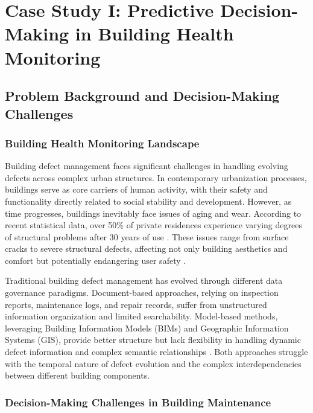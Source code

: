 
\chapter{Case Study I: Predictive Decision-Making in Building Health Monitoring} \label{chp:building}


\section{Problem Background and Decision-Making Challenges}

\subsection{Building Health Monitoring Landscape}

Building defect management faces significant challenges in handling evolving defects across complex urban structures. In contemporary urbanization processes, buildings serve as core carriers of human activity, with their safety and functionality directly related to social stability and development. However, as time progresses, buildings inevitably face issues of aging and wear. According to recent statistical data, over 50\% of private residences experience varying degrees of structural problems after 30 years of use \cite{spencer2019advances}. These issues range from surface cracks to severe structural defects, affecting not only building aesthetics and comfort but potentially endangering user safety \cite{zhang2023automated}.

Traditional building defect management has evolved through different data governance paradigms. Document-based approaches, relying on inspection reports, maintenance logs, and repair records, suffer from unstructured information organization and limited searchability. Model-based methods, leveraging Building Information Models (BIMs) and Geographic Information Systems (GIS), provide better structure but lack flexibility in handling dynamic defect information and complex semantic relationships \cite{li2024single}. Both approaches struggle with the temporal nature of defect evolution and the complex interdependencies between different building components.

\subsection{Decision-Making Challenges in Building Maintenance}

